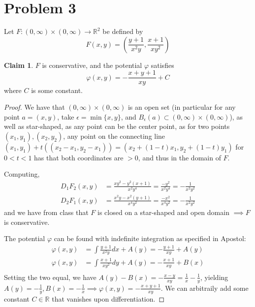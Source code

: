 \documentclass[12pt,letterpaper]{article}
\theoremstyle{definition}
\newtheorem*{claim}{Claim}
\newcommand{\R}{\mathbb{R}}
\begin{document}
\section*{Problem 3}

Let $F:(0,\infty)\times(0,\infty) \rightarrow \R^2$ be defined by
\[
  F(x,y) = \left( \frac{y+1}{x^2y}, \frac{x+1}{xy^2} \right)
\]

\begin{claim}
  $F$ is conservative, and the potential $\varphi$ satisfies
  \[
    \varphi(x,y) = -\frac{x + y + 1}{xy} + C
  \]
  where $C$ is some constant.
\end{claim}

\begin{proof}
  We have that $(0,\infty)\times(0,\infty)$ is an open set (in particular for
  any point $a = (x,y)$, take $\epsilon = \min\{x, y\}$, and $B_\epsilon(a)
  \subset (0,\infty)\times(0,\infty)$), as well as star-shaped, as any point can
  be the center point, as for two points $(x_1, y_1), (x_2, y_2)$, any point on
  the connecting line $(x_1, y_1) + t((x_2-x_1, y_2 - x_1)) = (x_2 + (1-t)x_1,
  y_2 + (1-t)y_1)$ for $0 < t < 1$ has that both coordinates are $> 0$, and thus
  in the domain of $F$.

  Computing,
  \begin{align*}
    D_1F_2(x,y) &= \frac{xy^2 - y^2(x+1)}{x^2y^4} = \frac{-y^2}{x^2y^4} = -\frac{1}{x^2y^2}\\
    D_2F_1(x,y) &= \frac{x^2y - x^2(y+1)}{x^4y^2} = \frac{-x^2}{x^4y^2} = -\frac{1}{x^2y^2}
  \end{align*}
  and we have from class that $F$ is closed on a star-shaped and open domain
  $\implies F$ is conservative.

  The potential $\varphi$ can be found with indefinite integration as specified in
  Apostol:
  \begin{align*}
    \varphi(x, y) &= \int \frac{y+1}{x^2y}dx + A(y) = -\frac{y+1}{xy} + A(y) \\
    \varphi(x, y) &= \int \frac{x+1}{xy^2}dy + A(y) = -\frac{x+1}{xy} + B(x) \\
  \end{align*}
  Setting the two equal, we have $A(y) - B(x) = -\frac{x-y}{xy} = \frac{1}{x} -
  \frac{1}{y}$, yielding $A(y) = -\frac{1}{y}, B(x) = -\frac{1}{x} \implies
  \varphi(x,y) = -\frac{x+y+1}{xy}$. We can arbitraily add some constant $C \in \R$
  that vanishes upon differentiation.
\end{proof}
\end{document}
